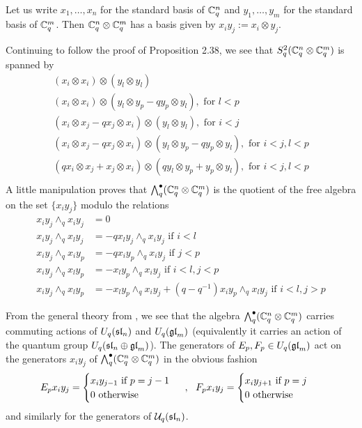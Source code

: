 \documentclass[11pt,leqno]{article}
\begin{document}
Let us write $ x_1, \dots, x_n $ for the standard basis of $ \bC_q^n $ and $ y_1, \dots, y_m $ for the standard basis of $ \bC_q^m $.  Then $ \bC_q^n \otimes \bC_q^m $ has a basis given by $ x_i y_j := x_i \otimes y_j $.

Continuing to follow the proof of Proposition 2.38, we see that $ S^2_q (\bC_q^n \otimes \bC_q^m) $ is spanned by
\begin{gather*}
(x_i \otimes x_i) \otimes (y_l \otimes y_l) \\
(x_i \otimes x_i) \otimes (y_l \otimes y_p - q y_p \otimes y_l), \text{ for } l < p \\
(x_i \otimes x_j - q x_j \otimes x_i) \otimes (y_l \otimes y_l), \text{ for } i < j \\
(x_i \otimes x_j - q x_j \otimes x_i) \otimes (y_l \otimes y_p - q y_p \otimes y_l), \text{ for } i < j, l < p \\
(q x_i \otimes x_j +  x_j \otimes x_i) \otimes (q y_l \otimes y_p +  y_p \otimes y_l), \text{ for } i < j, l < p \\
\end{gather*}
A little manipulation proves that $ \Alt^\bullet_q(\bC_q^n \otimes \bC_q^m) $ is the quotient of the free algebra on the set $ \{ x_i y_j \} $ modulo the relations
\begin{align*}
x_iy_j \wedge_q x_i y_j &= 0 \\
x_iy_j \wedge_q x_l y_j &= - q x_l y_j \wedge_q x_i y_j  \text{ if } i < l \\
x_i y_j \wedge_q x_i y_p &= - q x_i y_p \wedge_q x_i y_j \text{ if } j < p \\
x_i y_j \wedge_q x_l y_p &= -x_l y_p \wedge_q x_i y_j \text{ if  } i < l, j < p \\
x_i y_j \wedge_q x_l y_p &= -x_l y_p \wedge_q x_i y_j + (q - q^{-1}) x_i y_p \wedge_q x_l y_j \text{ if } i < l, j > p 
\end{align*}

From the general theory from \cite{BW}, we see that the algebra $ \Alt^\bullet_q(\bC_q^n \otimes \bC_q^m) $ carries commuting actions of $ U_q(\sl_n) $ and $ U_q(\gl_m) $ (equivalently it carries an action of the quantum group $ U_q(\sl_n \oplus \gl_m) $).  The generators of $E_p, F_p 
\in U_q(\gl_m) $ act on the generators $ x_i y_j $ of $\Alt^\bullet_q(\bC_q^n \otimes \bC_q^m) $ in the obvious fashion
$$
E_p x_i y_j = \begin{cases} x_i y_{j-1} \text{ if $ p = j-1 $ } \\
 0 \text{  otherwise}
 \end{cases}, \ \ F_p x_i y_j = \begin{cases} x_i y_{j+1} \text{ if $ p = j $ } \\
 0 \text{ otherwise}
 \end{cases}
$$
and similarly for the generators of $ \Uq(\sl_n) $.
\end{document}
